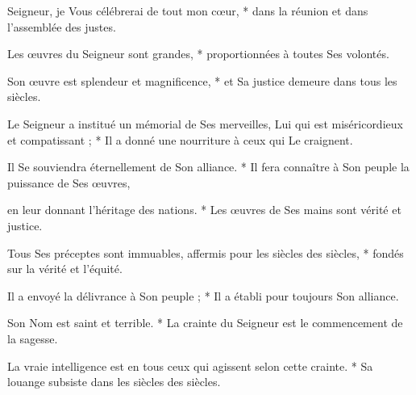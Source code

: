 \item Seigneur, je Vous célébrerai de tout mon cœur, * dans la réunion et dans l'assemblée des justes.
\item Les œuvres du Seigneur sont grandes, * proportionnées à toutes Ses volontés.
\item Son œuvre est splendeur et magnificence, * et Sa justice demeure dans tous les siècles.
\item Le Seigneur a institué un mémorial de Ses merveilles, Lui qui est miséricordieux et compatissant ; * Il a donné une nourriture à ceux qui Le craignent.
\item Il Se souviendra éternellement de Son alliance. * Il fera connaître à Son peuple la puissance de Ses œuvres,
\item en leur donnant l'héritage des nations. * Les œuvres de Ses mains sont vérité et justice.
\item Tous Ses préceptes sont immuables, affermis pour les siècles des siècles, * fondés sur la vérité et l'équité.
\item Il a envoyé la délivrance à Son peuple ; * Il a établi pour toujours Son alliance.
\item {} Son Nom est saint et terrible. * La crainte du Seigneur est le commencement de la sagesse.
\item La vraie intelligence est en tous ceux qui agissent selon cette crainte. * Sa louange subsiste dans les siècles des siècles.